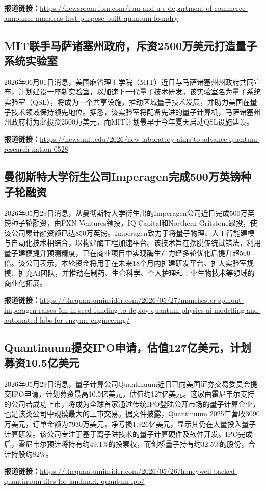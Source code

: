 \documentclass[12pt,a4paper]{ctexart}
\begin{document}
\noindent\textbf{报道链接：}\url{https://newsroom.ibm.com/ibm-and-u-s-department-of-commerce-announce-americas-first-purpose-built-quantum-foundry}

\subsection{ MIT联手马萨诸塞州政府，斥资2500万美元打造量子系统实验室 }

2026年06月01日消息，美国麻省理工学院（MIT）近日与马萨诸塞州州政府共同宣布，计划建设一座新实验室，以加速下一代量子技术研发。该实验室名为量子系统实验室（QSL），将成为一个共享设施，推动区域量子技术发展，并助力美国在量子技术领域保持领先地位。据悉，该实验室将配备先进的量子计算机，马萨诸塞州州政府将为此投资2500万美元，而MIT计划最早于今年夏天启动QSL设施建设。

\noindent\textbf{报道链接：}\url{https://news.mit.edu/2026/new-laboratory-aims-to-advance-quantum-research-nation-0528}

\subsection{ 曼彻斯特大学衍生公司Imperagen完成500万英镑种子轮融资 }

2026年05月29日消息，从曼彻斯特大学衍生出的Imperagen公司近日完成500万英镑种子轮融资，由PXN Ventures领投，IQ Capital和Northern Gritstone跟投，使该公司累计融资额已达850万英镑。Imperagen致力于将量子物理、人工智能建模与自动化技术相结合，以构建酶工程加速平台。该技术旨在摆脱传统试错法，利用量子建模提升预测精度，已在商业项目中实现酶生产力经多轮优化后提升超500倍。该公司表示，本轮资金将用于在未来18个月内扩建研发平台、扩大实验室规模、扩充AI团队，并推动在制药、生命科学、个人护理和工业生物技术等领域的商业化拓展。

\noindent\textbf{报道链接：}\url{https://thequantuminsider.com/2026/05/27/manchester-spinout-imperagen-raises-5m-in-seed-funding-to-deploy-quantum-physics-ai-modelling-and-automated-labs-for-enzyme-engineering/}

\subsection{ Quantinuum提交IPO申请，估值127亿美元，计划募资10.5亿美元 }

2026年05月29日消息，量子计算公司Quantinuum近日已向美国证券交易委员会提交IPO申请，计划募资最高10.5亿美元，估值约127亿美元。这家由霍尼韦尔支持的公司若成功上市，将成为全球首家通过传统IPO登陆公开市场的量子计算企业，也是该类公司中规模最大的上市交易。据文件披露，Quantinuum 2025年营收3090万美元，订单金额为7930万美元，净亏损1.926亿美元，显示其仍在大量投入量子计算研发。该公司专注于基于离子阱技术的量子计算硬件及软件开发。IPO完成后，霍尼韦尔预计将持有约49.1\%的投票权，而剑桥量子持有约32.5\%的股份，合计持股约82\%。

\noindent\textbf{报道链接：}\url{https://thequantuminsider.com/2026/05/26/honeywell-backed-quantinuum-files-for-landmark-quantum-ipo/}
\end{document}
